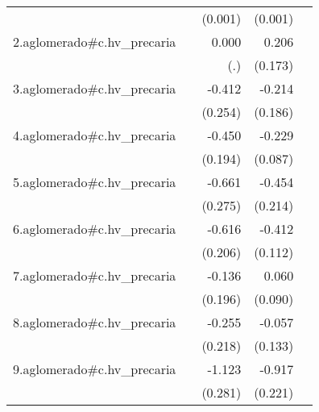 {\begin{longtable}{l*{4}{D{.}{.}{-1}}}
            &                     &     (0.001)         &     (0.001)         &                     \\
\addlinespace
2.aglomerado#c.hv\_precaria&                     &       0.000         &       0.206         &                     \\
            &                     &         (.)         &     (0.173)         &                     \\
\addlinespace
3.aglomerado#c.hv\_precaria&                     &      -0.412         &      -0.214         &                     \\
            &                     &     (0.254)         &     (0.186)         &                     \\
\addlinespace
4.aglomerado#c.hv\_precaria&                     &      -0.450\sym{*}  &      -0.229\sym{**} &                     \\
            &                     &     (0.194)         &     (0.087)         &                     \\
\addlinespace
5.aglomerado#c.hv\_precaria&                     &      -0.661\sym{*}  &      -0.454\sym{*}  &                     \\
            &                     &     (0.275)         &     (0.214)         &                     \\
\addlinespace
6.aglomerado#c.hv\_precaria&                     &      -0.616\sym{**} &      -0.412\sym{***}&                     \\
            &                     &     (0.206)         &     (0.112)         &                     \\
\addlinespace
7.aglomerado#c.hv\_precaria&                     &      -0.136         &       0.060         &                     \\
            &                     &     (0.196)         &     (0.090)         &                     \\
\addlinespace
8.aglomerado#c.hv\_precaria&                     &      -0.255         &      -0.057         &                     \\
            &                     &     (0.218)         &     (0.133)         &                     \\
\addlinespace
9.aglomerado#c.hv\_precaria&                     &      -1.123\sym{***}&      -0.917\sym{***}&                     \\
            &                     &     (0.281)         &     (0.221)         &                     \\

\end{longtable}}
